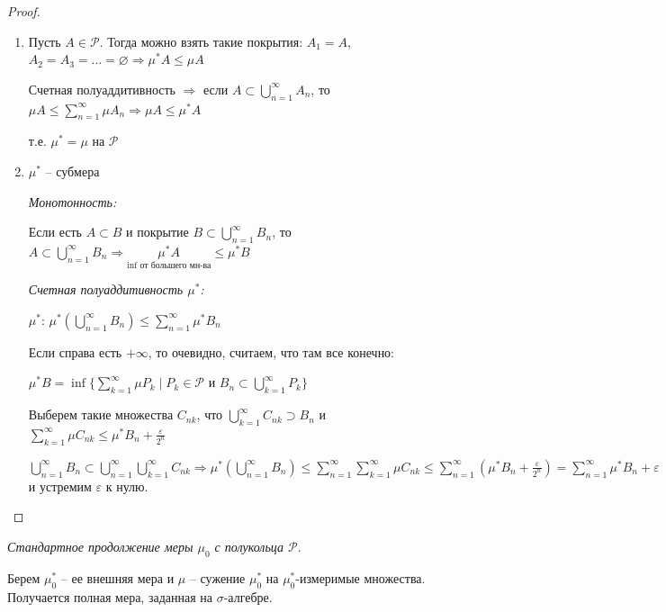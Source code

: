\begin{proof}~
    \begin{enumerate}
        \item Пусть $A\in\mathcal{P}$. Тогда можно взять такие покрытия: $A_1=A$, $A_2=A_3=...=\varnothing\Rightarrow \mu^* A\leq \mu A$
        
        Счетная полуаддитивность $\Rightarrow$ если $A\subset \bigcup\limits_{n=1}^\infty A_n$, 
        то $\mu A \leq \sum \limits_{n=1}^\infty \mu A_n\Rightarrow \mu A \leq \mu^* A$

        т.е. $\mu^* =\mu$ на $\mathcal{P}$

        \item $\mu^*$ – субмера 
        
        \textit{Монотонность:} 
        
        Если есть $A\subset B$ и покрытие $B\subset \bigcup\limits_{n=1}^\infty B_n$, то $A\subset \bigcup\limits_{n=1}^\infty B_n\Rightarrow
        \underset{\inf \text{ от большего мн-ва}}{\mu^* A} \leq \mu^*B$ 
        
        \textit{Счетная полуаддитивность $\mu^*$:} 
        
        $\mu^*$: $\mu^*(\bigcup\limits_{n=1}^\infty B_n)\leq \sum\limits_{n=1}^\infty \mu^* B_n$ 
        
        Если справа есть $+\infty$, то очевидно, считаем, что там все конечно:

        $\mu^* B =\inf \{\sum\limits_{k=1}^\infty \mu P_k\mid P_k\in \mathcal{P}\text{ и } B_n\subset \bigcup\limits_{k=1}^\infty P_k\}$

        Выберем такие множества $C_{nk}$, что $\bigcup\limits_{k=1}^\infty C_{nk}\supset B_n$ и $\sum\limits_{k=1}^\infty \mu C_{nk}\leq \mu^* B_n +\frac{\varepsilon}{2^n}$

        $\bigcup\limits_{n=1}^\infty B_n\subset \bigcup\limits_{n=1}^\infty\bigcup\limits_{k=1}^\infty C_{nk}\Rightarrow 
        \mu^* (\bigcup\limits_{n=1}^\infty B_n)\leq \sum\limits_{n=1}^\infty\sum\limits_{k=1}^\infty \mu C_{nk}\leq
        \sum\limits_{n=1}^\infty (\mu^* B_n + \frac{\varepsilon}{2^n})=\sum\limits_{n=1}^\infty \mu^* B_n + \varepsilon$ и устремим $\varepsilon$ к нулю.
    \end{enumerate}
\end{proof}

\begin{definition}
    \textit{Стандартное продолжение меры $\mu_0$ с полукольца $\mathcal{P}$}.

    Берем $\mu_0^*$ – ее внешняя мера и $\mu$ – сужение $\mu_0^*$ на $\mu_0^*$-измеримые множества. 
    Получается полная мера, заданная на $\sigma$-алгебре.
\end{definition}

